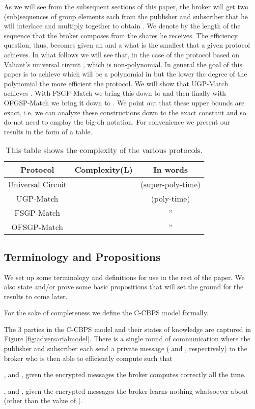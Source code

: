 As we will see from the  subsequent sections of this paper, the broker
will get two (sub)sequences of  group elements each from the publisher
and subscriber that he will  interlace and multiply together to obtain
. We  denote by   the length  of the sequence  that the
broker composes from the  shares he receives. The efficiency question,
thus, becomes  given an   and a   what is the  smallest 
that a given  protocol achieves. In what follows we  will see that, in
the  case  of  the  protocol  based  on  Valiant's  universal  circuit
\cite{V76},  which is non-polynomial.  In
general  the goal of  this paper  is to  achieve   which will  be a
polynomial in  but the lower  the degree of the polynomial the more
efficient  the protocol.  We will  show that  UGP-Match achieves  .   With  FSGP-Match   we  bring  this   down  to
 and then finally with OFGSP-Match we bring it down
to . We point out that these upper bounds are exact,
i.e. we can analyze these constructions down to the exact constant and
so  do not need  to employ  the big-oh  notation.  For  convenience we
present our results in the form of a table.

\begin{table}[h]
\centering
\begin{tabular}{||c|cc||}
\hline \hline
Protocol & Complexity(L) & In words\\ \hline \hline
Universal Circuit &  & (super-poly-time)\\ \hline
UGP-Match &  & (poly-time)\\ \hline
FSGP-Match &  & '' \\ \hline
OFSGP-Match &  & ''\\
\hline \hline
\end{tabular}
\caption{This table shows the complexity of the various protocols.}
\label{tab:complexity}
\end{table}


\subsection{Terminology and Propositions}
\label{subsec:terminology}
We set up some terminology and  definitions for use in the rest of the
paper. We  also state and/or  prove some basic propositions  that will
set the ground for the results to come later.  

For the sake of completeness we define the C-CBPS model formally.
\begin{definition}[C-CBPS]
The 3  parties in the C-CBPS  model and their states  of knowledge are
captured in Figure \ref{fig:adversarialmodel}. There is a single round
of  communication  where the  publisher  and  subscriber  each send  a
private  message (  and ,  respectively)  to the
broker who is then able to efficiently compute  such that

  , and ,  given the
encrypted   messages    the   broker  computes
 correctly all the time.

  ,  and  , given  the
encrypted  messages   the broker  learns nothing
whatsoever about  (other than the value of ).

\end{definition}


